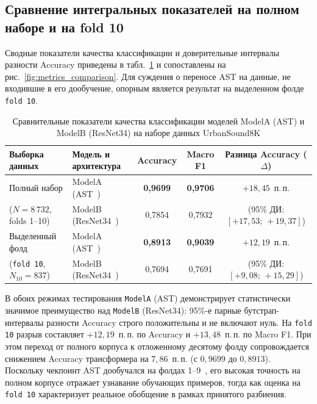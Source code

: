 \documentclass[pdflatex,sn-mathphys-num]{sn-jnl}
\begin{document}
\subsection{Сравнение интегральных показателей на полном наборе и на fold 10}

Сводные показатели качества классификации и доверительные интервалы разности Accuracy приведены в табл.~\ref{tab:main_comparison} и сопоставлены на рис.~\ref{fig:metrics_comparison}. Для суждения о переносе AST на данные, не входившие в его дообучение, опорным является результат на выделенном фолде \texttt{fold 10}.

\begin{table}[htbp]
\caption{Сравнительные показатели качества классификации моделей ModelA (AST) и ModelB (ResNet34) на наборе данных UrbanSound8K}\label{tab:main_comparison}
\footnotesize
\setlength{\tabcolsep}{5pt}
\begin{tabular}{|l|l|c|c|c|}
\hline
Выборка данных & Модель и архитектура & Accuracy & Macro F1 & Разница Accuracy ($\Delta$) \\
\hline
Полный набор & ModelA (AST~\cite{ref14}) & \textbf{0,9699} & \textbf{0,9706} & $+18{,}45$~п.\,п. \\
($N = 8\,732$, folds 1--10) & ModelB (ResNet34~\cite{ref15}) & 0,7854 & 0,7932 & (95\% ДИ: $[+17{,}53;\, +19{,}37]$) \\
\hline
Выделенный фолд & ModelA (AST~\cite{ref14}) & \textbf{0,8913} & \textbf{0,9039} & $+12{,}19$~п.\,п. \\
(\texttt{fold 10}, $N_{10} = 837$) & ModelB (ResNet34~\cite{ref15}) & 0,7694 & 0,7691 & (95\% ДИ: $[+9{,}08;\, +15{,}29]$) \\
\hline
\end{tabular}
\end{table}
\FloatBarrier

В обоих режимах тестирования \texttt{ModelA} (AST) демонстрирует статистически значимое преимущество над \texttt{ModelB} (ResNet34): 95\%-е парные бутстрап-интервалы разности Accuracy строго положительны и не включают нуль. На \texttt{fold 10} разрыв составляет $+12{,}19$~п.\,п. по Accuracy и $+13{,}48$~п.\,п. по Macro F1. При этом переход от полного корпуса к отложенному десятому фолду сопровождается снижением Accuracy трансформера на $7{,}86$~п.\,п. (с $0{,}9699$ до $0{,}8913$). Поскольку чекпоинт AST дообучался на фолдах 1--9~\cite{ref14}, его высокая точность на полном корпусе отражает узнавание обучающих примеров, тогда как оценка на \texttt{fold 10} характеризует реальное обобщение в рамках принятого разбиения.
\end{document}
